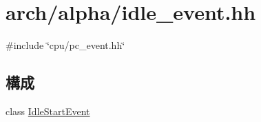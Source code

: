 \hypertarget{alpha_2idle__event_8hh}{
\section{arch/alpha/idle\_\-event.hh}
\label{alpha_2idle__event_8hh}
}
{\ttfamily \#include \char`\"{}cpu/pc\_\-event.hh\char`\"{}}\par
\subsection*{構成}
\begin{DoxyCompactItemize}
\item 
class \hyperlink{classIdleStartEvent}{IdleStartEvent}
\end{DoxyCompactItemize}
